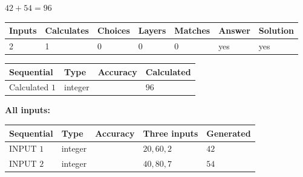\documentclass[12pt]{article}
\begin{document}
 
 
 
\noindent{}
 
 

$ %
42 +  %
54=   %
96$
 
 
\noindent{}
 
 

 
   
   
   
   
\noindent\begin{tabular}{|l|l|l|l|l|l|l|}
 \hline
Inputs & Calculates & Choices & Layers & Matches & Answer & Solution \\ \hline
 2  & 
 1  & 
 0
  & 
 0  & 
 0  & 
  yes & 
  yes 
  \\ \hline
 \end{tabular}
   
   
   
   
\noindent{}
   
   
  
  
\noindent\begin{tabular}{|l|l|l|l|}
\hline
 Sequential & Type & Accuracy & Calculated \\ 
\hline
 
 
  Calculated $  1 $ & integer &  & 
  $ 96 $ 
 \\  \hline  
 \end{tabular}
   
   
   
   
\noindent\vspace{0.1in}\hspace{-0.08in} {\textbf{\Large{All inputs: }}}
   
   
  
  
\noindent\begin{tabular}{|l|l|l|l|l|}
\hline
 Sequential & Type & Accuracy & Three inputs & Generated \\ 
\hline
 
 
  INPUT $  1 $ & integer &  & $
 20
 , 
 60
 , 
 2
 $ & $ 42 $ 
 \\  \hline  
 
 
  INPUT $  2 $ & integer &  & $
 40
 , 
 80
 , 
 7
 $ & $ 54 $ 
 \\  \hline  
 \end{tabular}
   
\end{document}
